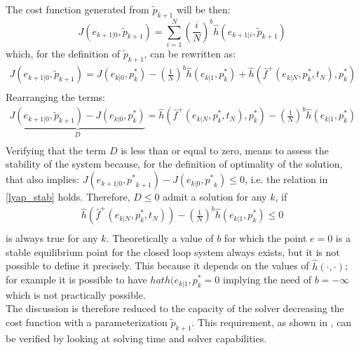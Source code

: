 \documentclass[12pt]{article}
\begin{document}
The cost function generated from $\tilde{p}_{k+1}$ will be then:
\begin{equation}
	J({e}_{k+1|0},\tilde{p}_{k+1})=\sum_{i=1}^{N}\left(\frac{i}{N}\right)^b\hat{h}(e_{k+1|i},\tilde{p}_{k+1})
\end{equation}
which, for the definition of $\tilde{p}_{k+1}$, can be rewritten as:
\begin{equation}
\begin{split}
	J({e}_{k+1|0},\tilde{p}_{k+1})=J({e}_{k|0},p^*_k) -\left( \frac{1}{N} \right)^b\hat{h}(e_{k|1},p^*_{k}) + \hat{h}(\hat{f}^+(e_{k|N},p^*_k,t_N),p^*_k) \\
\end{split}
\end{equation}
Rearranging the terms:
\begin{equation}
\begin{split}
	\underbrace{J({e}_{k+1|0},\tilde{p}_{k+1})-J({e}_{k|0},p^*_k)}_{D}= \hat{h}(\hat{f}^+(e_{k|N},p^*_k,t_N),p^*_k) -\left( \frac{1}{N} \right)^b\hat{h}(e_{k|1},p^*_{k}) \\
\end{split}
\end{equation}
Verifying that the term $D$ is less than or equal to zero, means to assess the stability of the system because, for the definition of optimality of the solution, that also implies: $J({e}_{k+1|0},{p^*}_{k+1}) - J({e}_{k|0},{p^*}_k) \leq 0$, i.e. the relation in \ref{lyap_stab} holds. Therefore, $D\leq0$ admit a solution for any $k$, if 
\begin{equation}
\begin{split}
	\hat{h}(\hat{f}^+(e_{k|N},p^*_k,t_N))-\left( \frac{1}{N} \right)^b\hat{h}(e_{k|1},p^*_{k}) \leq 0 \\
\end{split}
\end{equation}
is always true for any $k$. Theoretically a value of $b$ for which the point $e=0$ is a stable equilibrium point for the closed loop system always exists, but it is not possible to define it precisely. This because it depends on the values of $\hat{h}(\cdot,\cdot)$; for example it is possible to have $hat{h}(e_{k|1},p^*_{k}=0$ implying the need of $b=-\infty$ which is not practically possible.\\ The discussion is therefore reduced to the capacity of the solver decreasing the cost function with a parameterization $\tilde{p}_{k+1}$. This requirement, as shown in \cite{alamir_boh}, can be verified by looking at solving time and solver capabilities.
\end{document}
